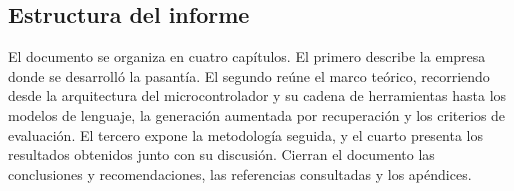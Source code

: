 \subsection*{Estructura del informe}

El documento se organiza en cuatro capítulos. El primero describe la empresa
donde se desarrolló la pasantía. El segundo reúne el marco teórico, recorriendo
desde la arquitectura del microcontrolador y su cadena de herramientas hasta los
modelos de lenguaje, la generación aumentada por recuperación y los criterios de
evaluación. El tercero expone la metodología seguida, y el cuarto presenta los
resultados obtenidos junto con su discusión. Cierran el documento las
conclusiones y recomendaciones, las referencias consultadas y los apéndices.
